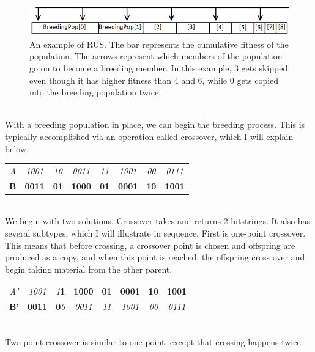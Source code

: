 \begin{figure}
	\centering
	\includegraphics[width=0.7\linewidth]{figures/png/RUSIllustration}
	\caption[Roullete Uniform Selection]{An example of RUS. The bar represents the cumulative fitness of the population. The arrows represent which members of the population go on to become a breeding member.  In this example, 3 gets skipped even though it has higher fitness than 4 and 6, while 0 gets copied into the breeding population twice.}
	\label{fig:rusillustration}
	
\end{figure}
\\
With a breeding population in place, we can begin the breeding process.  This is typically accomplished via an operation called crossover, which I will explain below.  \\
\begin{tabular}{|c|c|c|c|c|c|c|c|}
	\hline
	\textit{A} & \textit{1001} & \textit{10} & \textit{0011} & \textit{11} & \textit{1001} & \textit{00} & \textit{0111}\\ 
	\textbf{B} & \textbf{0011} & \textbf{01} & \textbf{1000} & \textbf{01} & \textbf{0001} & \textbf{10} & \textbf{1001}\\
	\hline
\end{tabular}\\
We begin with two solutions.  Crossover takes and returns 2 bitstrings.    It also has several subtypes, which I will illustrate in sequence.  First is one-point crossover.  This means that before crossing, a crossover point is chosen and offspring are produced as a copy, and when this point is reached, the offspring cross over and begin taking material from the other parent.  \\

\begin{tabular}{|c|c|c|c|c|c|c|c|}
	\hline
	\textit{A'} & \textit{1001} & \textit{1}\textbf{1} & \textbf{1000} & \textbf{01} & \textbf{0001} & \textbf{10} & \textbf{1001}\\ 
	\textbf{B'} & \textbf{0011} & \textbf{0}\textit{0} & \textit{0011} & \textit{11} & \textit{1001} & \textit{00} & \textit{0111}\\
	\hline
\end{tabular}\\

Two point crossover is similar to one point, except that crossing happens twice.\\

